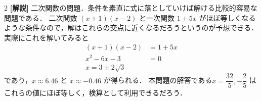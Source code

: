 \documentclass[../../main.tex]{subfiles}
\begin{document}
\begin{multicols}{2}
  {\bf [解説]}
  二次関数の問題．条件を素直に式に落としていけば解ける比較的容易な問題である．
  二次関数 $(x+1)(x-2)$ と一次関数 $1+5x$ がほぼ等しくなるような条件なので，解はこれらの交点に近くなるだろうというのが予想できる．
  実際にこれを解いてみると
  \begin{align}
    (x+1)(x-2)   & = 1 + 5x \\
    x^2 - 6x - 3 & = 0   \\
    x = 3 \pm 2\sqrt{3}
  \end{align}
  であり，$x \approx 6.46$ と $x \approx -0.46$ が得られる．
  本問題の解答である$x = \dfrac{32}{5}, -\dfrac{2}{5}$ はこれらの値にほぼ等しく，検算として利用できるだろう．

  \newpage
\end{multicols}
\end{document}
